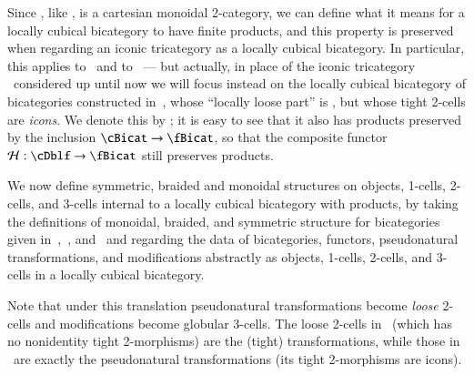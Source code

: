 Since \cDbl, like \Icon, is a cartesian monoidal 2-category, we can define what it means for a locally cubical bicategory to have finite products, and this property is preserved when regarding an iconic tricategory as a locally cubical bicategory.
In particular, this applies to \cDblf\ and to \cBicat\ --- but actually, in place of the iconic tricategory \cBicat\ considered up until now we will focus instead on the locally cubical bicategory of bicategories constructed in~\cite{gg:ldstr-tricat}, whose ``locally loose part'' is \cBicat, but whose tight 2-cells are \emph{icons}.
We denote this by \fBicat; it is easy to see that it also has products preserved by the inclusion $\cBicat\to \fBicat$, so that the composite functor $\cH : \cDblf \to\fBicat$ still preserves products.

We now define symmetric, braided and monoidal structures on objects, 1-cells, 2-cells, and 3-cells internal to a locally cubical bicategory with products, by taking the definitions of monoidal, braided, and symmetric structure for bicategories given in~\cite{nick:tricatsbook},~\cite{mccrudden:bal-coalgb}, and~\cite{gg:ldstr-tricat} and regarding the data of bicategories, functors, pseudonatural transformations, and modifications abstractly as objects, 1-cells, 2-cells, and 3-cells in a locally cubical bicategory.

Note that under this translation pseudonatural transformations become \emph{loose} 2-cells and modifications become globular 3-cells.
The loose 2-cells in \cDblf\ (which has no nonidentity tight 2-morphisms) are the (tight) transformations, while those in \fBicat\ are exactly the pseudonatural transformations (its tight 2-morphisms are icons).

